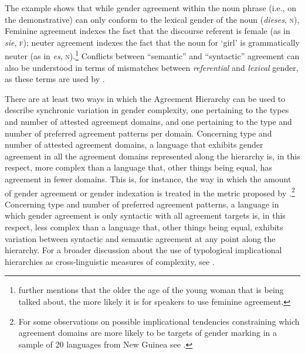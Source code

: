 \documentclass[output=collectionpaper]{langsci/langscibook}
\begin{document}
The example shows that while gender agreement within the noun phrase (i.e., on the demonstrative) can only conform to the lexical gender of the noun (\textit{dieses}, \textsc{n}), 
Feminine agreement indexes the fact that the discourse referent is female (as in \textit{sie}, \textsc{f}); neuter agreement indexes the fact that the noun for `girl' is grammatically neuter (as in \textit{es}, \textsc{n}).\footnote{\citet[228]{Corbett1991} further mentions that the older the age of the young woman that is being talked about, the more likely it is for speakers to use feminine agreement.}  Conflicts between ``semantic'' and ``syntactic'' agreement can also be understood in terms of mismatches between \textit{referential} and \textit{lexical} gender, as these terms are used by \citet{Dahl2000a} \citep[see also the study of the evolution of gender marking in medieval  by][]{Siemund2011}.

There are at least two ways in which the Agreement Hierarchy can be used to describe synchronic variation in gender complexity, one pertaining to the types and number of attested agreement domains, and one pertaining to the type and number of preferred agreement patterns per domain. Concerning type and number of attested agreement domains, a language that exhibits gender agreement in all the agreement domains represented along the hierarchy is, in this respect, more complex than a language that, other things being equal, has agreement in fewer domains. This is, for instance, the way in which the amount of gender agreement or gender indexation is treated in the metric proposed by \citet{DiGarbo2016}.\footnote{For some observations on possible  implicational tendencies constraining which agreement domains are more likely to be targets of gender marking in a sample of 20 languages from New Guinea see .} Concerning type and number of preferred agreement patterns, a language in which gender agreement is only syntactic with all agreement targets is, in this respect, less complex than a language that, other things being equal, exhibits variation between syntactic and semantic agreement at any point along the hierarchy. For a broader discussion about the use of typological implicational hierarchies as cross-linguistic measures of complexity, see \citet{Miestamo2009}.
\end{document}
